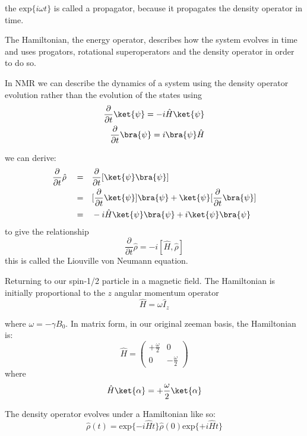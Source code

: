 the $\text{exp}\{i\omega t\}$ is called a propagator, because it propagates the density operator in time.

The Hamiltonian, the energy operator, describes how the system evolves in time and uses progators, rotational superoperators and the density operator in order to do so.



In NMR we can  describe the dynamics of a system using the density operator evolution rather than the evolution of the states using
\begin{align}
  \frac{\partial}{\partial{t}}\ket{\psi} = -i\hat{H}\ket{\psi}\\
  \frac{\partial}{\partial{t}}\bra{\psi} = i\bra{\psi}\hat{H}
\end{align}

we can derive\citep{Neumann2018}:
\begin{align}
  \frac{\partial}{\partial{t}}\hat\rho\quad=&\quad \frac{\partial}{\partial{t}}[\ket{\psi}\bra{\psi}]\\
  =&\quad[\frac{\partial}{\partial{t}}\ket{\psi}]\bra{\psi} + \ket{\psi}[\frac{\partial}{\partial{t}}\bra{\psi}]\\
  =&\quad-i\hat{H}\ket{\psi}\bra{\psi} + i\ket{\psi}\bra{\psi}
\end{align}
to give the relationship
\begin{equation}
  \frac{\partial}{\partial{t}}\hat\rho = -i[\hat{H},\hat\rho]
\end{equation}
this is called the Liouville von Neumann equation.

Returning to our spin-1/2 particle in a magnetic field. The Hamiltonian is initially
proportional to the $z$ angular momentum operator
\begin{equation}
  \hat{H} = \omega\hat{I}_z
\end{equation}

where $\omega = -\gamma B_0$. In matrix form, in our original zeeman basis, the Hamiltonian is:
\begin{equation}
  \hat{H} = \begin{pmatrix}
+\frac{\omega}{2} & 0\\
0 & -\frac{\omega}{2}
\end{pmatrix}
\end{equation}
where
\begin{equation}
  \hat{H}\ket{\alpha} = +\frac{\omega}{2}\ket{\alpha}
\end{equation}

The density operator evolves under a Hamiltonian like so:
\begin{equation}
  \hat\rho(t) = \text{exp}\{-i\hat{H}t\}\hat\rho(0)\text{exp}\{+i\hat{H}t\}
\end{equation}

